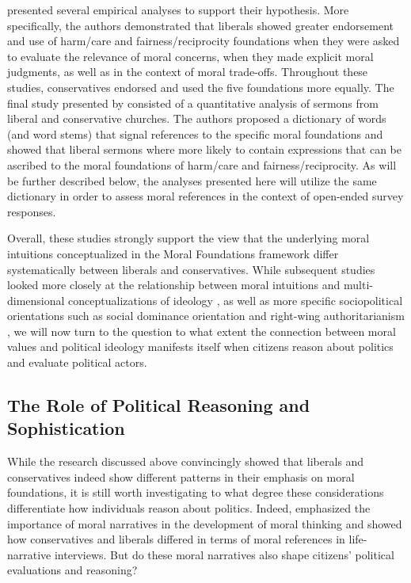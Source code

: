 \documentclass[12pt]{article}
\begin{document}
\citet{graham2009liberals} presented several empirical analyses to support their hypothesis. More specifically, the authors demonstrated that liberals showed greater endorsement and use of harm/care and fairness/reciprocity foundations when they were asked to evaluate the relevance of moral concerns, when they made explicit moral judgments, as well as in the context of moral trade-offs. Throughout these studies, conservatives endorsed and used the five foundations more equally. The final study presented by \citet{graham2009liberals} consisted of a quantitative analysis of sermons from liberal and conservative churches. The authors proposed a dictionary of words (and word stems) that signal references to the specific moral foundations and showed that liberal sermons where more likely to contain expressions that can be ascribed to the moral foundations of harm/care and fairness/reciprocity. As will be further described below, the analyses presented here will utilize the same dictionary in order to assess moral references in the context of open-ended survey responses.

Overall, these studies strongly support the view that the underlying moral intuitions conceptualized in the Moral Foundations framework differ systematically between liberals and conservatives. While subsequent studies looked more closely at the relationship between moral intuitions and multi-dimensional conceptualizations of ideology \citep[c.f.][]{haidt2009above}, as well as more specific sociopolitical orientations such as social dominance orientation and right-wing authoritarianism \citep[c.f.][]{federico2013mapping}, we will now turn to the question to what extent the connection between moral values and political ideology manifests itself when citizens reason about politics and evaluate political actors.


\subsection{The Role of Political Reasoning and Sophistication}

While the research discussed above convincingly showed that liberals and conservatives indeed show different patterns in their emphasis on moral foundations, it is still worth investigating to what degree these considerations differentiate how individuals reason about politics. Indeed, \citet{haidt2008moral} emphasized the importance of moral narratives in the development of moral thinking and \citet{mcadams2008family} showed how conservatives and liberals differed in terms of moral references in life-narrative interviews. But do these moral narratives also shape citizens' political evaluations and reasoning?
\end{document}
